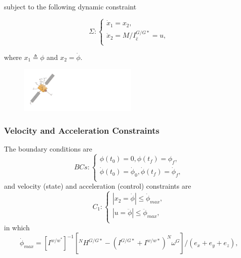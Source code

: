 \documentclass[letterpaper, preprint, paper,11pt]{AAS}	%
\begin{document}
			subject to the following dynamic constraint
			
			\begin{equation}\label{system}
				\Sigma:\left\{
				\begin{array}{l}
				\dot{x}_1=x_2, \\
				\dot{x}_2=M/I_{\hat{e}}^{G/G*}=u, \\
				\end{array}
				\right.
			\end{equation}
			
			where $x_1 \triangleq\phi$ and $x_2=\dot{\phi}$. 
			
			\begin{figure}[H]
				\begin{center}
				\includegraphics[width=2.25in]{./Figures/Spacecraft}  
				\end{center}    
			\end{figure}
		

		\subsubsection{Velocity and Acceleration Constraints}

			The boundary conditions are
			\begin{equation}\label{Bcs}
				BCs:\left\{
				\begin{array}{l}
				\phi(t_0)=0, \phi(t_f)=\phi_{f},\\
				\dot{\phi}(t_0)=\dot{\phi}_{0},\dot{ \phi}(t_f)=\dot{\phi}_{f}, \\
				\end{array}
				\right.
			\end{equation}
			and velocity (state) and acceleration (control) constraints are
			\begin{equation}\label{constraints1}
				C_1:\left\{
				\begin{array}{l}
				|x_2=\dot{\phi}|\leq \dot{\phi}_{max},\\
				|u=\ddot{\phi}|\leq \ddot{\phi}_{max},\\
				\end{array}
				\right.
			\end{equation}
			in which
			\begin{equation}
				\dot{\phi}_{max}=[I^{w/w^*}]^{-1}[^NH^{G/G*}-(I^{G/G*}+I^{w/w*})^N\omega^G]/(e_x+e_y+e_z),
			\end{equation}
\end{document}
